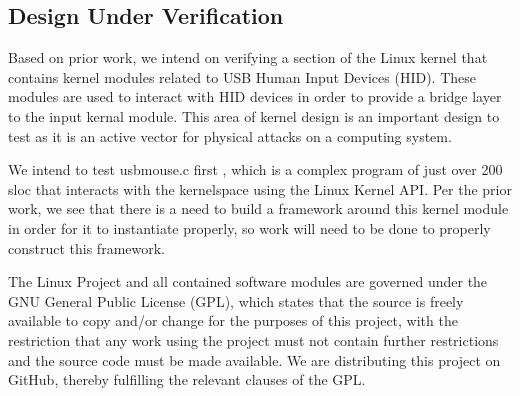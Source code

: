 \subsection{Design Under Verification}
Based on prior work\cite{usbkbd}, we intend on verifying a section of the Linux kernel
that contains kernel modules related to USB Human Input Devices (HID).
These modules are used to interact with HID devices in order to provide a bridge layer
to the input kernal module.
This area of kernel design is an important design to test as it is an active vector
for physical attacks on a computing system.
\par
We intend to test usbmouse.c first \cite{usbhid}, 
which is a complex program of just over 200 sloc that interacts with the kernelspace using
the Linux Kernel API.
Per the prior work, we see that there is a need to build a framework around this kernel module
in order for it to instantiate properly, so work will need to be done to properly construct
this framework.
\par
The Linux Project and all contained software modules are governed under the GNU General
Public License (GPL), which states that the source is freely available to copy and/or change
for the purposes of this project, with the restriction that any work using the project
must not contain further restrictions and the source code must be made available.
We are distributing this project on GitHub, thereby fulfilling the relevant clauses of the GPL.
